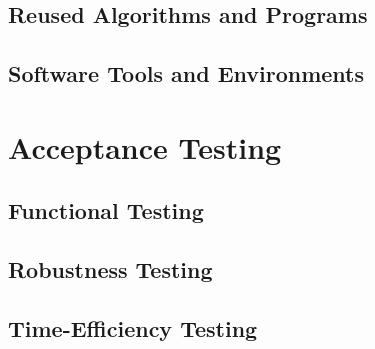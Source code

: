 \documentclass{article}
\begin{document}
\subsection{Reused Algorithms and Programs}

\subsection{Software Tools and Environments}

\section{Acceptance Testing}
\subsection{Functional Testing}

\subsection{Robustness Testing}

\subsection{Time-Efficiency Testing}
\end{document}
